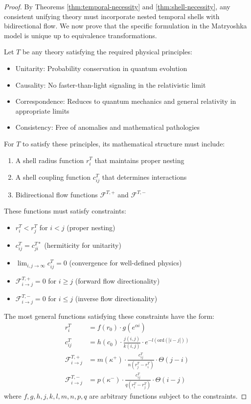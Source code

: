 \documentclass[12pt,a4paper]{article}
\newcommand{\ord}{\text{ord}}
\begin{document}
\begin{proof}
By Theorems \ref{thm:temporal-necessity} and \ref{thm:shell-necessity}, any consistent unifying theory must incorporate nested temporal shells with bidirectional flow. We now prove that the specific formulation in the Matryoshka model is unique up to equivalence transformations.

Let $T$ be any theory satisfying the required physical principles:
\begin{itemize}
    \item Unitarity: Probability conservation in quantum evolution
    \item Causality: No faster-than-light signaling in the relativistic limit
    \item Correspondence: Reduces to quantum mechanics and general relativity in appropriate limits
    \item Consistency: Free of anomalies and mathematical pathologies
\end{itemize}

For $T$ to satisfy these principles, its mathematical structure must include:
\begin{enumerate}
    \item A shell radius function $r_i^T$ that maintains proper nesting
    \item A shell coupling function $c_{ij}^T$ that determines interactions
    \item Bidirectional flow functions $\mathcal{F}^{T,+}$ and $\mathcal{F}^{T,-}$
\end{enumerate}

These functions must satisfy constraints:
\begin{itemize}
    \item $r_i^T < r_j^T$ for $i < j$ (proper nesting)
    \item $c_{ij}^T = c_{ji}^{T*}$ (hermiticity for unitarity)
    \item $\lim_{i,j \to \infty} c_{ij}^T = 0$ (convergence for well-defined physics)
    \item $\mathcal{F}^{T,+}_{i \to j} = 0$ for $i \geq j$ (forward flow directionality)
    \item $\mathcal{F}^{T,-}_{i \to j} = 0$ for $i \leq j$ (inverse flow directionality)
\end{itemize}

The most general functions satisfying these constraints have the form:
\begin{align}
r_i^T &= f(r_0) \cdot g(e^{\alpha i}) \\
c_{ij}^T &= h(c_0) \cdot \frac{j(i,j)}{k(i,j)} \cdot e^{-l(\ord(|i-j|))} \\
\mathcal{F}^{T,+}_{i \to j} &= m(\kappa^+) \cdot \frac{c_{ij}^T}{n(r_j^T - r_i^T)} \cdot \Theta(j - i) \\
\mathcal{F}^{T,-}_{i \to j} &= p(\kappa^-) \cdot \frac{c_{ij}^T}{q(r_i^T - r_j^T)} \cdot \Theta(i - j)
\end{align}
where $f, g, h, j, k, l, m, n, p, q$ are arbitrary functions subject to the constraints.


\end{proof}
\end{document}
